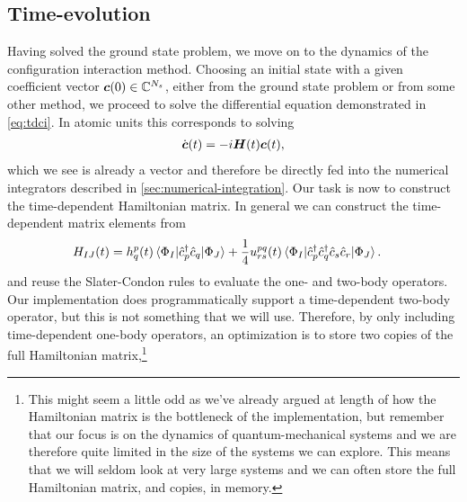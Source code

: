         \subsection{Time-evolution}
            Having solved the ground state problem, we move on to the dynamics
            of the configuration interaction method.
            Choosing an initial state with a given coefficient vector
            $\boldsymbol{c}(0) \in \mathbb{C}^{N_s}$, either from the ground state
            problem or from some other method, we proceed to solve the
            differential equation demonstrated in \autoref{eq:tdci}.
            In atomic units this corresponds to solving
            \begin{align}
                \dot{\boldsymbol{c}}(t) = -i\boldsymbol{H}(t)\boldsymbol{c}(t),
            \end{align}
            which we see is already a vector and therefore be directly fed into
            the numerical integrators described in
            \autoref{sec:numerical-integration}.
            Our task is now to construct the time-dependent Hamiltonian matrix.
            In general we can construct the time-dependent matrix elements from
            \begin{align}
                H_{IJ}(t)
                &=
                h^{p}_{q}(t)
                \mel*{\Phi_I}{\hat{c}_{p}^{\dagger}\hat{c}_{q}}{\Phi_J}
                + \frac{1}{4}u^{pq}_{rs}(t)
                \mel*{\Phi_I}{
                    \hat{c}_{p}^{\dagger}\hat{c}_{q}^{\dagger}\hat{c}_{s}\hat{c}_{r}
                }{\Phi_J}.
            \end{align}
            and reuse the Slater-Condon rules to evaluate the one- and two-body
            operators.
            Our implementation does programmatically support a time-dependent
            two-body operator, but this is not something that we will use.
            Therefore, by only including time-dependent one-body operators, an
            optimization is to store two copies of the full Hamiltonian
            matrix,\footnote{%
                This might seem a little odd as we've already argued at length
                of how the Hamiltonian matrix is the bottleneck of the
                implementation, but remember that our focus is on the dynamics
                of quantum-mechanical systems and we are therefore quite limited
                in the size of the systems we can explore.
                This means that we will seldom look at very large systems and we
                can often store the full Hamiltonian matrix, and copies, in
                memory.
            }
